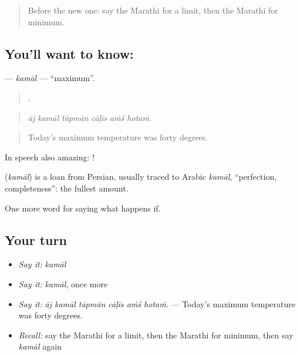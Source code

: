 \begin{quote}
Before the new one: say the Marathi for a limit, then the Marathi for minimum.
\end{quote}

\subsection*{You'll want to know: }
\textbf{} — \emph{kamāl} — \textquotedblleft{}maximum\textquotedblright{}.

\begin{quote}
     .
\end{quote}

\begin{quote}
\emph{āj kamāl tāpmān cāḷīs aṁś hotaṁ.}
\end{quote}

\begin{quote}
Today's maximum temperature was forty degrees.
\end{quote}

In speech also amazing:  !

\begin{cousinweb}
\textbf{} (\emph{kamāl}) is a loan from Persian, usually traced to Arabic \emph{kamāl}, \textquotedblleft{}perfection, completeness\textquotedblright{}: the fullest amount.
\end{cousinweb}

\begin{grammarlens}[title={What you've built}]
One more word for saying what happens if.
\end{grammarlens}

\subsection*{Your turn}
\begin{itemize}
\raggedright
  \item \emph{Say it:} \emph{kamāl}
  \item \emph{Say it:} \emph{kamāl}, once more
  \item \emph{Say it:} \emph{āj kamāl tāpmān cāḷīs aṁś hotaṁ.} — Today's maximum temperature was forty degrees.
  \item \emph{Recall:} say the Marathi for a limit, then the Marathi for minimum, then say \emph{kamāl} again
\end{itemize}

